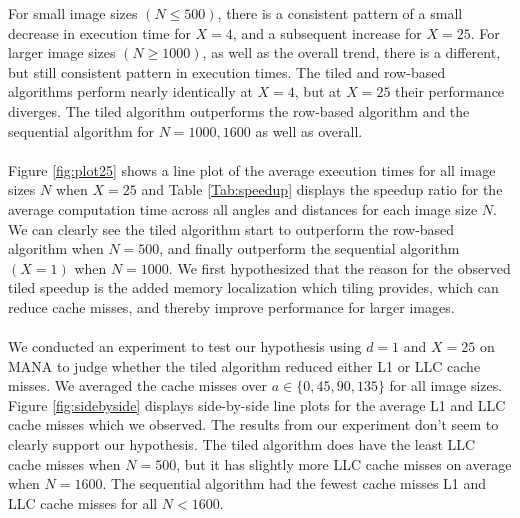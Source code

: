 \documentclass{article}
\begin{document}
    For small image sizes $(N \leq 500)$, there is a consistent pattern of a small decrease in execution time for $X = 4$, and a subsequent increase for $X = 25$. For larger image sizes $(N \geq 1000)$, as well as the overall trend, there is a different, but still consistent pattern in execution times. The tiled and row-based algorithms perform nearly identically at $X = 4$, but at $X = 25$ their performance diverges. The tiled algorithm outperforms the row-based algorithm and the sequential algorithm for $N = 1000, 1600$ as well as overall. \\ \\ 
     Figure \ref{fig:plot25} shows a line plot of the average execution times for all image sizes $N$ when $X = 25$ and Table \ref{Tab:speedup} displays the speedup ratio for the average computation time across all angles and distances for each image size $N$.  We can clearly see the tiled algorithm start to outperform the row-based algorithm when $N = 500$, and finally outperform the sequential algorithm $(X = 1)$ when $N = 1000$. We first hypothesized that the reason for the observed tiled speedup is the added memory localization which tiling provides, which can reduce cache misses, and thereby improve performance for larger images.\\ \\ 
    We conducted an experiment to test our hypothesis using $d = 1$ and $X = 25$ on MANA to judge whether the tiled algorithm reduced either L1 or LLC cache misses. We averaged the cache misses over $a \in \{0, 45, 90, 135\}$ for all image sizes. Figure \ref{fig:sidebyside} displays side-by-side line plots for the average L1 and LLC cache misses which we observed. The results from our experiment don't seem to clearly support our hypothesis. The tiled algorithm does have the least LLC cache misses when $N = 500$, but it has slightly more LLC cache misses on average when $N = 1600$. The sequential algorithm had the fewest cache misses L1 and LLC cache misses for all $N < 1600$. \\ \\
\end{document}
